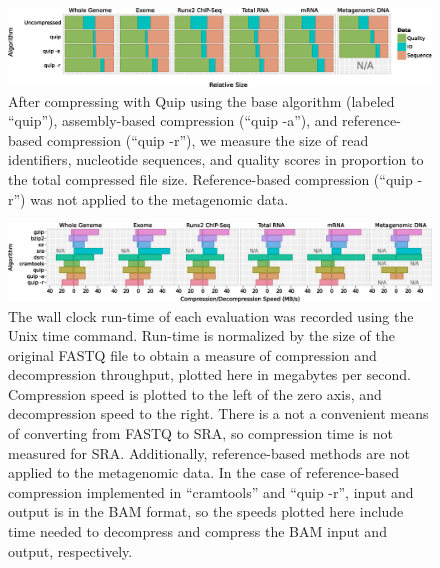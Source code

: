 \documentclass[a4,center,fleqn]{NAR}
\begin{document}
\begin{figure}
\centerline{\includegraphics[width=\textwidth]{relative_sizes.eps}}
\caption{
After compressing with Quip using the base algorithm (labeled ``quip''),
assembly-based compression (``quip -a''), and reference-based compression
(``quip -r''), we measure the size of read identifiers, nucleotide sequences,
and quality scores in proportion to the total compressed file size. Reference-based
compression (``quip -r'') was not applied to the metagenomic data.
}
\label{fig:relative_sizes}
\end{figure}



\begin{figure}
\centerline{\includegraphics[width=\textwidth]{comp_decomp_time.eps}}
\caption{
The wall clock run-time of each evaluation was recorded using the Unix time
command. Run-time is normalized by the size of the original FASTQ file to
obtain a measure of compression and decompression throughput, plotted here in megabytes
per second. Compression speed is plotted to the left of the zero axis, and
decompression speed to the right. There is a not a convenient means of
converting from FASTQ to SRA, so compression time is not measured for SRA.
Additionally, reference-based methods are not applied to the metagenomic data.
In the case of reference-based compression implemented in ``cramtools'' and
``quip -r'', input and output is in the BAM format, so the speeds plotted here
include time needed to decompress and compress the BAM input and output,
respectively.
}
\label{fig:comp_decomp_time}
\end{figure}
\end{document}
